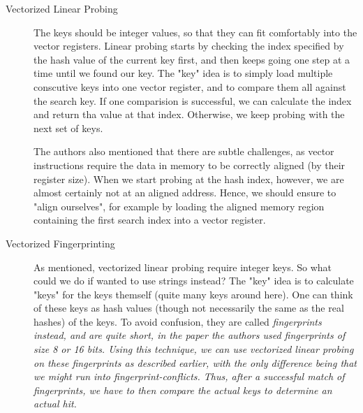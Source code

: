 \documentclass[../../main.tex]{subfiles}
\begin{document}
\begin{description}
    \item[Vectorized Linear Probing] The keys should be integer values, so that they can fit comfortably into the vector registers. Linear probing starts by checking the index specified by the hash value of the current key first, and then keeps going one step at a time until we found our key. The "key" idea is to simply load multiple conscutive keys into one vector register, and to compare them all against the search key. If one comparision is successful, we can calculate the index and return tha value at that index. Otherwise, we keep probing with the next set of keys.
    
    The authors also mentioned that there are subtle challenges, as vector instructions require the data in memory to be correctly aligned (by their register size). When we start probing at the hash index, however, we are almost certainly not at an aligned address. Hence, we should ensure to "align ourselves", for example by loading the aligned memory region containing the first search index into a vector register.

    \item[Vectorized Fingerprinting] As mentioned, vectorized linear probing require integer keys. So what could we do if wanted to use strings instead? The "key" idea is to calculate "keys" for the keys themself (quite many keys around here). One can think of these keys as hash values (though not necessarily the same as the real hashes) of the keys. To avoid confusion, they are called \em fingerprints \em instead, and are quite short, in the paper the authors used fingerprints of size 8 or 16 bits. Using this technique, we can use vectorized linear probing on these fingerprints as described earlier, with the only difference being that we might run into fingerprint-conflicts. Thus, after a successful match of fingerprints, we have to then compare the actual keys to determine an actual hit.
\end{description}
\end{document}
